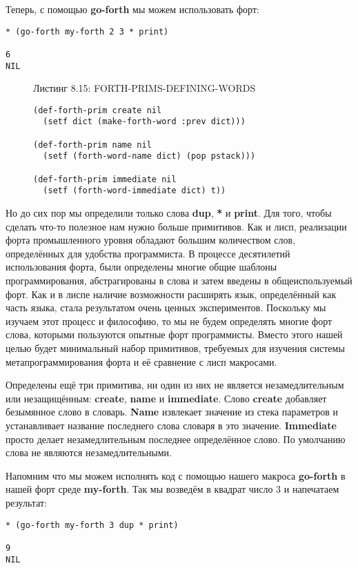 Теперь, с помощью \textbf{go-forth} мы можем использовать форт:

\begin{verbatim}
* (go-forth my-forth 2 3 * print)

6 
NIL
\end{verbatim}

\begin{figure}Листинг 8.15: FORTH-PRIMS-DEFINING-WORDS\label{listing_8.15}
\listbegin
\begin{verbatim}
(def-forth-prim create nil
  (setf dict (make-forth-word :prev dict)))

(def-forth-prim name nil
  (setf (forth-word-name dict) (pop pstack)))

(def-forth-prim immediate nil
  (setf (forth-word-immediate dict) t))
\end{verbatim}
\listend
\end{figure}

Но до сих пор мы определили только слова \textbf{dup}, \textbf{*} и \textbf{print}. Для того, чтобы сделать что-то полезное нам нужно больше примитивов. Как и лисп, реализации форта промышленного уровня обладают большим количеством слов, определённых для удобства программиста. В процессе десятилетий использования форта, были определены многие общие шаблоны программирования, абстрагированы в слова и затем введены в общеиспользуемый форт. Как и в лиспе наличие возможности расширять язык, определённый как часть языка, стала результатом очень ценных экспериментов. Поскольку мы изучаем этот процесс и философию, то мы не будем определять многие форт слова, которыми пользуются опытные форт программисты. Вместо этого нашей целью будет минимальный набор примитивов, требуемых для изучения системы метапрограммирования форта и её сравнение с лисп макросами.

Определены ещё три примитива, ни один из них не является незамедлительным или незащищённым: \textbf{create}, \textbf{name} и \textbf{immediate}. Слово \textbf{create} добавляет безымянное слово в словарь. \textbf{Name} извлекает значение из стека параметров и устанавливает название последнего слова словаря в это значение. \textbf{Immediate} просто делает незамедлительным последнее определённое слово. По умолчанию слова не являются незамедлительными.

Напомним что мы можем исполнять код с помощью нашего макроса \textbf{go-forth} в нашей форт среде \textbf{my-forth}. Так мы возведём в квадрат число 3 и напечатаем результат:

\begin{verbatim}
* (go-forth my-forth 3 dup * print)

9 
NIL
\end{verbatim}

